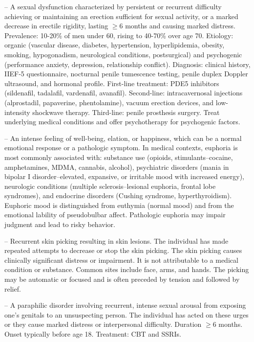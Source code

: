 -- A sexual dysfunction characterized by persistent or recurrent difficulty achieving or maintaining an erection sufficient for sexual activity, or a marked decrease in erectile rigidity, lasting \(\ge\)6 months and causing marked distress. Prevalence: 10-20\% of men under 60, rising to 40-70\% over age 70. Etiology: organic (vascular disease, diabetes, hypertension, hyperlipidemia, obesity, smoking, hypogonadism, neurological conditions, postsurgical) and psychogenic (performance anxiety, depression, relationship conflict). Diagnosis: clinical history, IIEF-5 questionnaire, nocturnal penile tumescence testing, penile duplex Doppler ultrasound, and hormonal profile. First-line treatment: PDE5 inhibitors (sildenafil, tadalafil, vardenafil, avanafil). Second-line: intracavernosal injections (alprostadil, papaverine, phentolamine), vacuum erection devices, and low-intensity shockwave therapy. Third-line: penile prosthesis surgery. Treat underlying medical conditions and offer psychotherapy for psychogenic factors.

-- An intense feeling of well-being, elation, or happiness, which can be a normal emotional response or a pathologic symptom. In medical contexts, euphoria is most commonly associated with: substance use (opioids, stimulants--cocaine, amphetamines, MDMA, cannabis, alcohol), psychiatric disorders (mania in bipolar I disorder--elevated, expansive, or irritable mood with increased energy), neurologic conditions (multiple sclerosis--lesional euphoria, frontal lobe syndromes), and endocrine disorders (Cushing syndrome, hyperthyroidism). Euphoric mood is distinguished from euthymia (normal mood) and from the emotional lability of pseudobulbar affect. Pathologic euphoria may impair judgment and lead to risky behavior.

-- Recurrent skin picking resulting in skin lesions. The individual has made repeated attempts to decrease or stop the skin picking. The skin picking causes clinically significant distress or impairment. It is not attributable to a medical condition or substance. Common sites include face, arms, and hands. The picking may be automatic or focused and is often preceded by tension and followed by relief.

-- A paraphilic disorder involving recurrent, intense sexual arousal from exposing one's genitals to an unsuspecting person. The individual has acted on these urges or they cause marked distress or interpersonal difficulty. Duration \(\ge\)6 months. Onset typically before age 18. Treatment: CBT and SSRIs.

